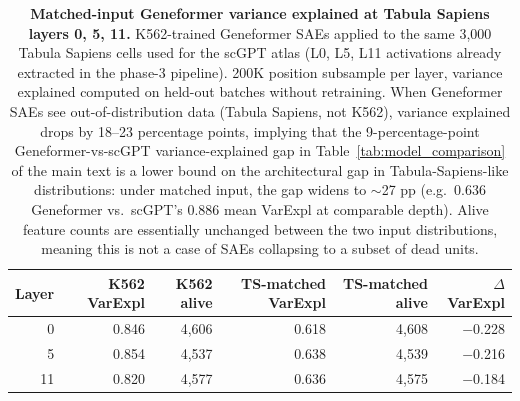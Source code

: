 \documentclass[onecolumn]{article}
\begin{document}
\begin{table}[H]
\centering
\caption{\textbf{Matched-input Geneformer variance explained at Tabula Sapiens layers 0, 5, 11.} K562-trained Geneformer SAEs applied to the same 3{,}000 Tabula Sapiens cells used for the scGPT atlas (L0, L5, L11 activations already extracted in the phase-3 pipeline). 200K position subsample per layer, variance explained computed on held-out batches without retraining. When Geneformer SAEs see out-of-distribution data (Tabula Sapiens, not K562), variance explained drops by 18--23 percentage points, implying that the 9-percentage-point Geneformer-vs-scGPT variance-explained gap in Table~\ref{tab:model_comparison} of the main text is a lower bound on the architectural gap in Tabula-Sapiens-like distributions: under matched input, the gap widens to $\sim$27 pp (e.g.\ 0.636 Geneformer vs.\ scGPT's 0.886 mean VarExpl at comparable depth). Alive feature counts are essentially unchanged between the two input distributions, meaning this is not a case of SAEs collapsing to a subset of dead units.}
\label{tab:matched}
\smallskip
\small
\begin{tabular}{rrrrrr}
\toprule
Layer & K562 VarExpl & K562 alive & TS-matched VarExpl & TS-matched alive & $\Delta$VarExpl \\
\midrule
0  & 0.846 & 4{,}606 & 0.618 & 4{,}608 & $-$0.228 \\
5  & 0.854 & 4{,}537 & 0.638 & 4{,}539 & $-$0.216 \\
11 & 0.820 & 4{,}577 & 0.636 & 4{,}575 & $-$0.184 \\
\bottomrule
\end{tabular}
\end{table}
\end{document}
